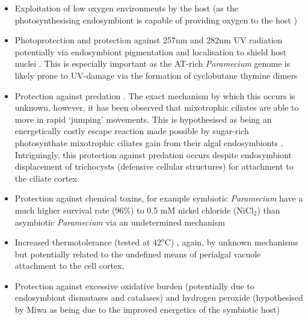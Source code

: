 \begin{itemize}
    \item Exploitation of low oxygen environments by the host (as the photosynthesising endosymbiont is capable of providing oxygen to the host \citep{Reisser1980})
\item Photoprotection and protection against 257nm and 282nm UV radiation potentially via endosymbiont pigmentation and localisation to shield host nuclei \citep{Sommaruga2009,Summerer2009,Miwa2009}.  
    This is especially important as the AT-rich \textit{Paramecium} genome is likely prone to UV-damage via the formation of cyclobutane thymine dimers \citep{Sommaruga2009}
\item Protection against predation \citep{Berger1980}. 
    The exact mechanism by which this occurs is unknown, however, it has been observed that mixotrophic ciliates are able to move in rapid `jumping' movements. 
    This is hypothesised as being an energetically costly escape reaction made possible by sugar-rich photosynthate mixotrophic ciliates gain from their algal endosymbionts \citep{Perez1997}. 
    Intriguingly, this protection against predation occurs despite endosymbiont displacement of trichocysts (defensive cellular structures) for attachment to the ciliate cortex \citep{Kodama2011}
\item Protection against chemical toxins, for example symbiotic \textit{Paramecium} have a much higher survival rate (96\%) to 0.5 mM nickel chloride (NiCl$_{2}$) than asymbiotic \textit{Paramecium} via an undetermined mechanism \citep{Miwa2009}
\item Increased thermotolerance (tested at $42^{o}$C) \citep{Miwa2009}, again, by unknown mechanisms but potentially related to the undefined means of perialgal vacuole attachment to the cell cortex.
\item Protection against excessive oxidative burden (potentially due to endosymbiont dismutases and catalases) \citep{Hortnagl2007a} and hydrogen peroxide (hypothesised by Miwa as being due to the improved energetics of the symbiotic host) \citep{Miwa2009}
\end{itemize}

